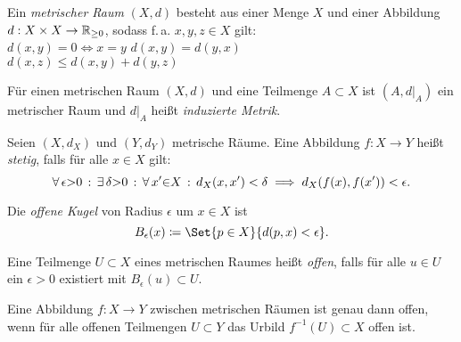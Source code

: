 \documentclass{cheat-sheet}
\newcommand{\inlineitem}[1]{\textbullet \enspace #1} %
\begin{document}



\begin{defn}
  Ein \emph{metrischer Raum} $(X, d)$ besteht aus einer Menge $X$ und einer Abbildung $d : X \times X \to \mathbb{R}_{\geq 0}$, sodass f.\,a. $x,y,z \in X$ gilt: \\
  \inlineitem{$d(x, y) = 0 \iff x = y$} \qquad
  \inlineitem{$d(x, y) = d(y, x)$}  \\
  \inlineitem{$d(x, z) \leq d(x, y) + d(y, z)$} 
\end{defn}


\begin{defn}
  Für einen metrischen Raum $(X, d)$ und eine Teilmenge $A \subset X$ ist $(A, d|_A)$ ein metrischer Raum und $d|_A$ heißt \emph{induzierte Metrik}.
\end{defn}

\begin{defn}
  Seien $(X, d_X)$ und $(Y, d_Y)$ metrische Räume. Eine Abbildung $f : X \to Y$ heißt \emph{stetig}, falls für alle $x \in X$ gilt:
  \[ \forall \, {\epsilon {>} 0} \,:\, \exists \, {\delta {>} 0} \,:\, \forall \, {x' {\in} X} \,:\, d_X(x, x') < \delta \implies d_X(f(x), f(x')) < \epsilon. \]
\end{defn}

\begin{defn}
  Die \emph{offene Kugel} von Radius $\epsilon$ um $x \in X$ ist
  \[ B_\epsilon(x) \coloneqq \Set{ p \in X }{ d(p, x) < \epsilon }. \]
\end{defn}

\begin{defn}
  Eine Teilmenge $U \subset X$ eines metrischen Raumes heißt \emph{offen}, falls für alle $u \in U$ ein $\epsilon > 0$ existiert mit $B_{\epsilon}(u) \subset U$.
\end{defn}

\begin{prop}
  Eine Abbildung $f : X \to Y$ zwischen metrischen Räumen ist genau dann offen, wenn für alle offenen Teilmengen $U \subset Y$ das Urbild $f^{-1}(U) \subset X$ offen ist.
\end{prop}
\end{document}
